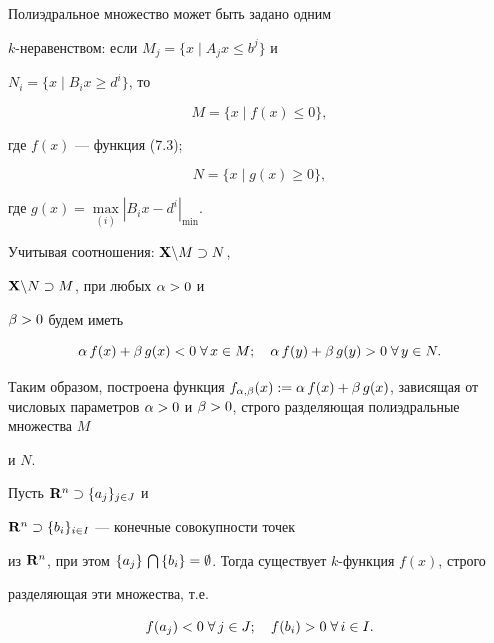 \begin{pf} Полиэдральное множество может быть задано одним


$k$-неравенством: если $M_j = \{x \mid A_j x \le b^j \}$ и


$N_i = \{ x \mid B_i x \ge d^i \}$, то


$$


M = \{ x \mid f (x) \le 0 \},


$$


где $f(x)$ --- функция (7.3);


$$


N = \{ x \mid g (x) \ge 0 \},


$$


где $g (x) =\max\limits_{(i)} |B_i x -d^i|_{\min}$.


Учитывая соотношения: $\bold X\backslash M \supset N$,


$\bold X\backslash N \supset M$, при любых $\alpha > 0$ и


$\beta > 0$ будем иметь


$$


\al\, f(x) + \be\, g(x) < 0\; \fo\, x \in M;\quad


\al\, f(y) + \be\, g(y) > 0\; \fo\, y \in N.


$$


Таким образом, построена функция $f_{\alpha,\beta} (x):=


\al\, f(x) + \be\, g(x)$, зависящая от числовых параметров $\al >


0$ и $\be > 0$, строго разделяющая полиэдральные множества $M$


и $N$.


\end{pf}





\begin{cors}


Пусть $\bold R^n \supset \{a_j\}_{j \in J}$ и


$\bold R^n \supset \{b_i\}_{i \in I}$ --- конечные совокупности точек


из $\R^n$, при этом $\{a_j\} \,\bigcap\,


\{b_i\} = \emp$. Тогда существует $k$-функция $f(x)$, строго


разделяющая эти множества, т.е.


$$


f(a_j) < 0\; \fo\, j \in J;\quad f(b_i) > 0\; \fo\, i \in I.


$$


\end{cors}





